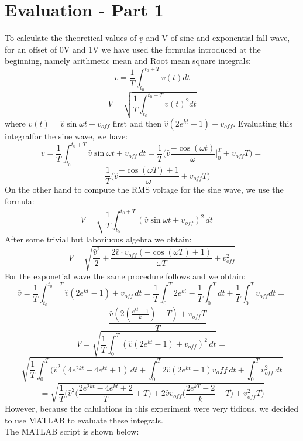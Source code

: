 \documentclass[12pt]{report}
\begin{document}
\chapter {Evaluation - Part 1}
To calculate the theoretical values of $\underline{v}$ and V of sine and exponential fall wave, for an offset of 0V and 1V we have used the formulas introduced at the beginning, namely arithmetic mean and Root mean square integrals:\\
$$ \bar{v} = \frac{1}{T} \int_{t_0}^{t_0+T}v(t)dt $$ 
$$ V=\sqrt{\frac{1}{T}\int_{t_0}^{t_0+T}v(t)^2 dt} $$
where $v(t) = \hat{v} \sin \omega t + v_{off} $ first and then $\hat{v}(2e^{kt}-1)+v_{off} $.
Evaluating this integralfor the sine wave, we have: 
$$  \bar{v} = \frac{1}{T}\int_{t_0}^{t_0+T} \hat{v} \sin \omega t + v_{off}\, dt = \frac{1}{T}\bigg(\hat{v} \frac{-\cos(\omega t)}{\omega}\bigg|_0^T+v_{off}T \bigg)= $$
$$=\frac{1}{T}\bigg(\hat{v} \frac{-\cos(\omega T)+1}{\omega}+v_{off}T \bigg) $$
On the other hand to compute the RMS voltage for the sine wave, we use the formula:
$$V=\sqrt{\frac{1}{T}\int_{t_0}^{t_0+T}(\hat{v} \sin \omega t + v_{off})^2\, dt} =$$
After some trivial but laboriuous algebra we obtain:
$$V=\sqrt{\frac{\hat{v}^2}{2}+\frac{2\hat{v}\cdot v_{off}(-\cos(\omega T)+1)}{\omega T}+v_{off}^2}$$
For the exponetial wave the same procedure follows and we obtain:
$$\bar{v} = \frac{1}{T}\int_{t_0}^{t_0+T} \hat{v}(2e^{kt}-1)+v_{off} \, dt =  \frac{1}{T}\int_0^{T} 2e^{kt}- \frac{1}{T}\int_{0}^{T} dt+ \frac{1}{T}\int_{0}^{T} v_{off} dt =$$
$$=\frac{\hat{v}(2(\frac{e^{kt}-1}{k})-T)+v_{off}T}{T}$$
$$V=\sqrt{\frac{1}{T}\int_0^T( \hat{v}(2e^{kt}-1)+v_{off})^2 \, dt}= $$
$$ = \sqrt{\frac{1}{T}\int_0^T ( \hat{v}^2(4e^{2kt}-4e^{kt}+1)\, dt+\int_0^T 2\hat{v}(2e^{kt}-1)v_off \, dt+\int_0^T v_{off}^2\, dt} =$$
$$ = \sqrt{\frac{1}{T} \bigg( \hat{v}^2\bigg(\frac{2e^{2kt}-4e^{kt}+2}{T}+T\bigg)+2\hat{v}v_{off}\bigg(\frac{2e^{kT}-2}{k}-T\bigg)+v_{off}^2T\bigg) }$$
However, because the calulations in this experiment were very tidious, we decided to use MATLAB to evaluate these integrals.\\
The MATLAB script is shown below: 
\end{document}
